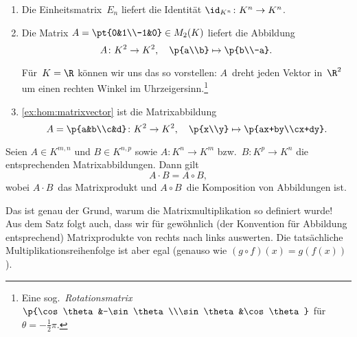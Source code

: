 \documentclass[a4paper]{article}
\begin{document}
\begin{example}\leavevmode
    \begin{enumerate}
        \item Die Einheitsmatrix~$E_n$ liefert die Identität $\id_{K^n}\colon K^n \to K^n$.
        \item Die Matrix $A = \pt{0&1\\-1&0} \in M_2(K)$ liefert die Abbildung
              \begin{equation*}
                  A\colon K^2 \to K^2,\quad \p{a\\b} \mapsto \p{b\\-a}.
              \end{equation*}

              Für~$K = \R$ können wir uns das so vorstellen: $A$~dreht jeden Vektor in~$\R^2$ um einen rechten Winkel im Uhrzeigersinn.\footnote{Eine sog.\ \emph{Rotationsmatrix} $\p{\cos\theta&-\sin\theta\\\sin\theta&\cos\theta}$ für~$\theta = -\frac{1}{2}\pi$.}
        \item \cref{ex:hom:matrixvector} ist die Matrixabbildung
              \begin{equation*}
                  A = \p{a&b\\c&d}\colon K^2 \to K^2,\quad \p{x\\y} \mapsto \p{ax+by\\cx+dy}.
              \end{equation*}
    \end{enumerate}
\end{example}

\begin{theorem}
    Seien $A \in K^{m,n}$ und $B \in K^{n,p}$ sowie $A\colon K^n \to K^m$ bzw.\ $B\colon K^p \to K^n$ die entsprechenden Matrixabbildungen. Dann gilt
    \begin{equation*}
        A\cdot B = A\circ B,
    \end{equation*}
    wobei $A\cdot B$~das Matrixprodukt und $A\circ B$~die Komposition von Abbildungen ist.
\end{theorem}

\begin{remark}
    Das ist genau der Grund, warum die Matrixmultiplikation so definiert wurde! Aus dem Satz folgt auch, dass wir für gewöhnlich (der Konvention für Abbildung entsprechend) Matrixprodukte von rechts nach links auswerten. Die tatsächliche Multiplikationsreihenfolge ist aber egal (genauso wie $(g\circ f)(x) = g(f(x))$).
\end{remark}
\end{document}
